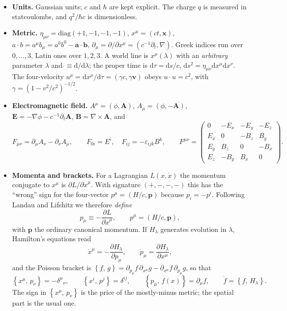 \documentclass[11pt,a4paper]{book}
\numberwithin{equation}{section}
\newcommand{\dd}{\mathrm{d}}
\newcommand{\pdv}[2]{\dfrac{\partial #1}{\partial #2}}
\newcommand{\PB}[2]{\left\{#1,\,#2\right\}}
\newcommand{\bx}{\mathbf{x}}
\newcommand{\bv}{\mathbf{v}}
\newcommand{\bp}{\mathbf{p}}
\newcommand{\bA}{\mathbf{A}}
\newcommand{\bE}{\mathbf{E}}
\newcommand{\bB}{\mathbf{B}}
\theoremstyle{definition}
\theoremstyle{remark}
\begin{document}
\begin{itemize}[leftmargin=*]
\item \textbf{Units.}  Gaussian units; $c$ and $\hbar$ are kept explicit.
  The charge $q$ is measured in statcoulombs, and $q^2/\hbar c$ is
  dimensionless.

\item \textbf{Metric.}  $\eta_{\mu\nu}=\mathrm{diag}(+1,-1,-1,-1)$,
  $x^\mu=(ct,\bx)$, $a\!\cdot\! b=a^\mu b_\mu=a^0b^0-\mathbf a\!\cdot\!\mathbf b$,
  $\partial_\mu=\partial/\partial x^\mu=(c^{-1}\partial_t,\nabla)$.
  Greek indices run over $0,\dots,3$, Latin ones over $1,2,3$.
  A world line is $x^\mu(\lambda)$ with an \emph{arbitrary} parameter
  $\lambda$ and $\dot{}\equiv \dd/\dd\lambda$; the proper time is
  $\dd\tau=\dd s/c$, $\dd s^2=\eta_{\mu\nu}\dd x^\mu\dd x^\nu$.
  The four-velocity $u^\mu=\dd x^\mu/\dd\tau=(\gamma c,\gamma\bv)$ obeys
  $u\!\cdot\! u=c^2$, with $\gamma=(1-v^2/c^2)^{-1/2}$.

\item \textbf{Electromagnetic field.}
  $A^\mu=(\phi,\bA)$, $A_\mu=(\phi,-\bA)$,
  $\bE=-\nabla\phi-c^{-1}\partial_t\bA$, $\bB=\nabla\times\bA$, and
  \begin{equation}
    F_{\mu\nu}=\partial_\mu A_\nu-\partial_\nu A_\mu,\qquad
    F_{0i}=E^i,\quad F_{ij}=-\varepsilon_{ijk}B^k,\qquad
    F^{\mu\nu}=\begin{pmatrix}
      0&-E_x&-E_y&-E_z\\ E_x&0&-B_z&B_y\\ E_y&B_z&0&-B_x\\ E_z&-B_y&B_x&0
    \end{pmatrix}.
    \label{eq:F-components}
  \end{equation}

\item \textbf{Momenta and brackets.}
  For a Lagrangian $L(x,\dot x)$ the momentum conjugate to $x^\mu$ is
  $\partial L/\partial\dot x^\mu$.  With signature $(+,-,-,-)$ this has the
  ``wrong'' sign for the four-vector $p^\mu=(H/c,\bp)$ because
  $p_i=-p^i$.  Following Landau and Lifshitz we therefore \emph{define}
  \begin{equation}
    p_\mu\equiv-\pdv{L}{\dot x^\mu},\qquad p^\mu=(H/c,\bp),
    \label{eq:p-def}
  \end{equation}
  with $\bp$ the ordinary canonical momentum.  If $H_\lambda$ generates
  evolution in $\lambda$, Hamilton's equations read
  \begin{equation}
    \dot x^\mu=-\pdv{H_\lambda}{p_\mu},\qquad
    \dot p_\mu=\pdv{H_\lambda}{x^\mu},
    \label{eq:Hamilton-cov}
  \end{equation}
  and the Poisson bracket is
  $\PB fg=\partial_{p_\mu}f\,\partial_{x^\mu}g-\partial_{x^\mu}f\,\partial_{p_\mu}g$, so that
  \begin{equation}
    \PB{x^\mu}{p_\nu}=-\delta^\mu{}_\nu,\qquad
    \PB{x^i}{p^j}=\delta^{ij},\qquad
    \PB{p_\mu}{f(x)}=\partial_\mu f,\qquad \dot f=\PB f{H_\lambda}.
    \label{eq:PB-conv}
  \end{equation}
  The sign in $\PB{x^\mu}{p_\nu}$ is the price of the mostly-minus metric;
  the spatial part is the usual one.


\end{itemize}
\end{document}
